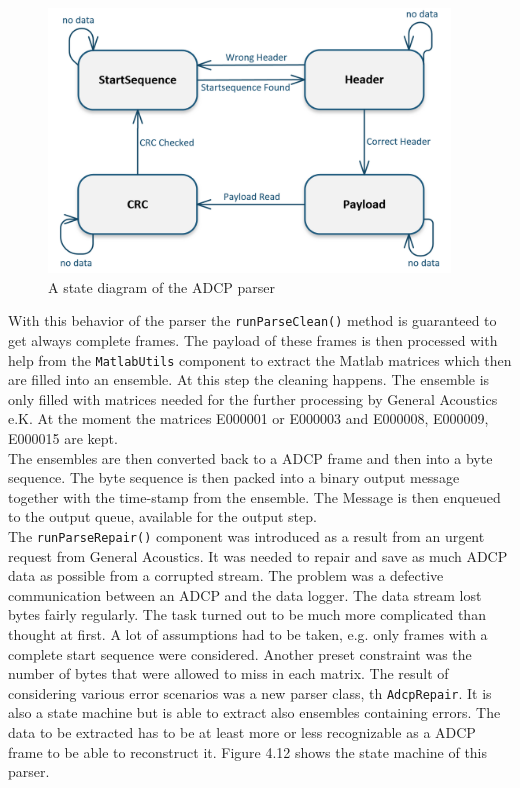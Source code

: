 \begin{figure}[h]
\centering
      \includegraphics[width=0.95\textwidth]{parser}
        \caption{A state diagram of the ADCP parser}
\end{figure}

With this behavior of the parser the \texttt{runParseClean()} method is  guaranteed to get always complete frames. The payload of these frames is then processed with help from the \texttt{MatlabUtils} component to extract the Matlab matrices which then are filled into an ensemble. At this step the cleaning happens. The ensemble is only filled with matrices needed for the further processing by General Acoustics e.K. At the moment the matrices E000001 or E000003 and E000008, E000009, E000015 are kept.\\
The ensembles are then converted back to a ADCP frame and then into a byte sequence. The byte sequence is then packed into a binary output message together with the time-stamp from the ensemble. The Message is then enqueued to the output queue, available for the output step.\\

The \texttt{runParseRepair()} component was introduced as a result from an urgent request from General Acoustics. It was needed to repair and save as much ADCP data as possible from a corrupted stream. The problem was a defective communication between an ADCP and the data logger. The data stream lost bytes fairly regularly.
The task turned out to be much more complicated than thought at first. A lot of assumptions had to be taken, e.g. only frames with a complete start sequence were considered. Another preset constraint was the number of bytes that were allowed to miss in each matrix. The result of considering various error scenarios was a new parser class, th \texttt{AdcpRepair}. It is also a state machine but is able to extract also ensembles containing errors. The data to be extracted has to be at least more or less recognizable as a ADCP frame to be able to reconstruct it. Figure 4.12 shows the state machine of this parser.\\

